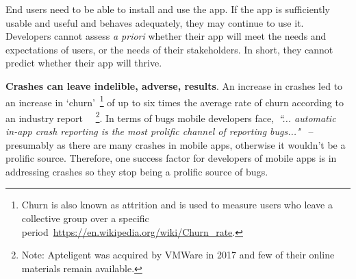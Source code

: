 End users need to be able to install and use the app. If the app is sufficiently usable and useful and behaves adequately, they may continue to use it. Developers cannot assess \emph{a priori} whether their app will meet the needs and expectations of users, or the needs of their stakeholders. 
In short, they cannot predict whether their app will thrive.


\medskip
\textbf{Crashes can leave indelible, adverse, results}. An increase in crashes led to an increase in `churn'~\footnote{Churn is also known as attrition and is used to measure users who leave a collective group over a specific period~\url{https://en.wikipedia.org/wiki/Churn_rate}.} of up to six times the average rate of churn according to an industry report ~\citep{levy2016_crash_and_churn_report, levy2017_the_crash_and_burn_report_findings}~\footnote{Note: Apteligent was acquired by VMWare in 2017 and few of their online materials remain available.}. %
In terms of bugs mobile developers face,~\emph{``... automatic in-app crash reporting is the most prolific channel of reporting bugs..."}~\citep{alsubaihin2019app_store_effects_on_software_engineering} %
-- presumably as there are many crashes in mobile apps, otherwise it wouldn't be a prolific source. Therefore, one success factor for developers of mobile apps is in addressing crashes so they stop being a prolific source of bugs. 

